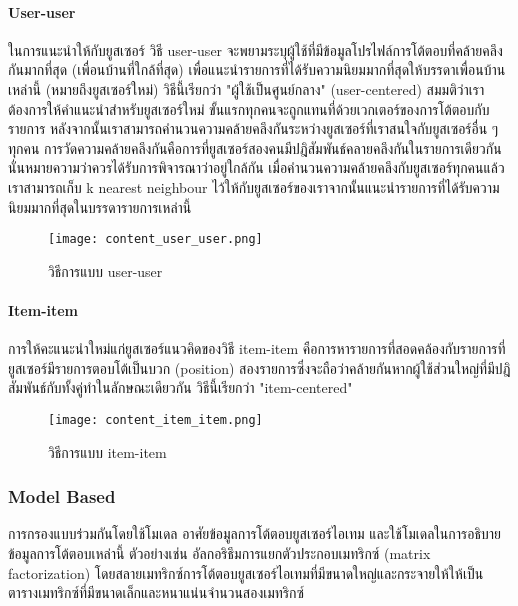 \paragraph{User-user}
ในการแนะนำให้กับยูสเซอร์ วิธี user-user จะพยามระบุผู้ใช้ที่มีข้อมูลโปรไฟล์การโต้ตอบที่คล้ายคลึงกันมากที่สุด (เพื่อนบ้านที่ใกล้ที่สุด) เพื่อแนะนำรายการที่ได้รับความนิยมมากที่สุดให้บรรดาเพื่อนบ้านเหล่านี้ (หมายถึงยูสเซอร์ใหม่) วิธีนี้เรียกว่า "ผู้ใช้เป็นศูนย์กลาง" (user-centered)
สมมติว่าเราต้องการให้คำแนะนำสำหรับยูสเซอร์ใหม่ ขั้นแรกทุกคนจะถูกแทนที่ด้วยเวกเตอร์ของการโต้ตอบกับรายการ หลังจากนั้นเราสามารถคำนวนความคล้ายคลึงกันระหว่างยูสเซอร์ที่เราสนใจกับยูสเซอร์อื่น ๆ ทุกคน การวัดความคล้ายคลึงกันคือการที่ยูสเซอร์สองคนมีปฎิสัมพันธ์คลายคลึงกันในรายการเดียวกันนั่นหมายความว่าควรได้รับการพิจารณาว่าอยู่ใกล้กัน เมื่อคำนวนความคล้ายคลึงกับยูสเซอร์ทุกคนแล้ว เราสามารถเก็บ k nearest neighbour ไว้ให้กับยูสเซอร์ของเราจากนั้นแนะนำรายการที่ได้รับความนิยมมากที่สุดในบรรดารายการเหล่านี้
\newline
\begin{figure}[!h]
  \centering
  \texttt{[image: content\_user\_user.png]}  
  \caption{\cite[baptiste]{baptiste} วิธีการแบบ user-user}
  \label{Fig:content_user_user}
\end{figure}
\paragraph{Item-item}
การให้คะแนะนำใหม่แก่ยูสเซอร์แนวคิดของวิธี item-item คือการหารายการที่สอดคล้องกับรายการที่ยูสเซอร์มีรายการตอบโต้เป็นบวก (position) สองรายการซึ่งจะถือว่าคล้ายกันหากผู้ใช้ส่วนใหญ่ที่มีปฎิสัมพันธ์กับทั้งคู่ทำในลักษณะเดียวกัน วิธีนี้เรียกว่า "item-centered"
\newline
\begin{figure}[!h]
  \centering
  \texttt{[image: content\_item\_item.png]}  
  \caption{\cite[baptiste]{baptiste} วิธีการแบบ item-item}
  \label{Fig:content_item_item}
\end{figure}
\subsubsection{Model Based}
การกรองแบบร่วมกันโดยใช้โมเดล อาศัยข้อมูลการโต้ตอบยูสเซอร์ไอเทม และใช้โมเดลในการอธิบายข้อมูลการโต้ตอบเหล่านี้ ตัวอย่างเช่น อัลกอริธึมการแยกตัวประกอบเมทริกซ์ (matrix factorization) โดยสลายเมทริกซ์การโต้ตอบยูสเซอร์ไอเทมที่มีขนาดใหญ่และกระจายให้ให้เป็นตารางเมทริกซ์ที่มีขนาดเล็กและหนาแน่นจำนวนสองเมทริกซ์
\pagebreak
    

